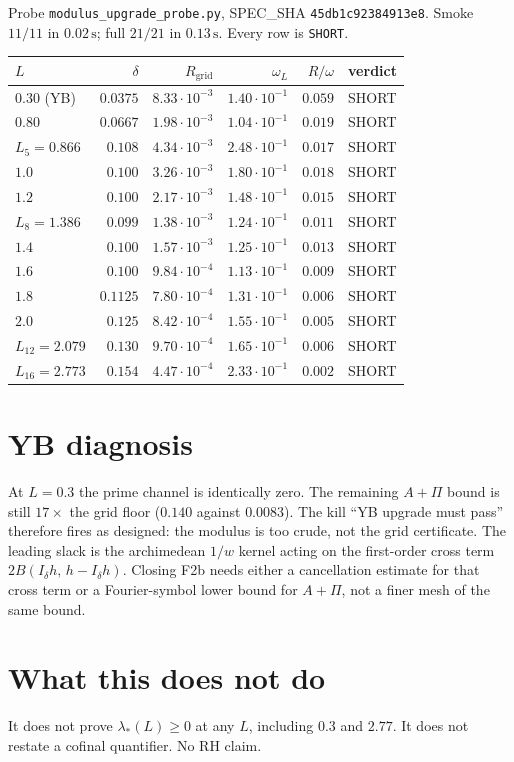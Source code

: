\documentclass[11pt]{article}
\theoremstyle{remark}
\begin{document}
Probe \texttt{modulus\_upgrade\_probe.py},
SPEC\_SHA \texttt{45db1c92384913e8}.
Smoke $11/11$ in $0.02\,\mathrm{s}$; full $21/21$ in $0.13\,\mathrm{s}$.
Every row is \texttt{SHORT}.

\begin{center}
\small
\begin{tabular}{@{}lrrrrl@{}}
\toprule
$L$ & $\delta$ & $R_{\mathrm{grid}}$ & $\omega_L$ & $R/\omega$ & verdict\\
\midrule
$0.30$ (YB) & $0.0375$ & $8.33\cdot10^{-3}$ & $1.40\cdot10^{-1}$ & $0.059$ & SHORT\\
$0.80$ & $0.0667$ & $1.98\cdot10^{-3}$ & $1.04\cdot10^{-1}$ & $0.019$ & SHORT\\
$L_5=0.866$ & $0.108$ & $4.34\cdot10^{-3}$ & $2.48\cdot10^{-1}$ & $0.017$ & SHORT\\
$1.0$ & $0.100$ & $3.26\cdot10^{-3}$ & $1.80\cdot10^{-1}$ & $0.018$ & SHORT\\
$1.2$ & $0.100$ & $2.17\cdot10^{-3}$ & $1.48\cdot10^{-1}$ & $0.015$ & SHORT\\
$L_8=1.386$ & $0.099$ & $1.38\cdot10^{-3}$ & $1.24\cdot10^{-1}$ & $0.011$ & SHORT\\
$1.4$ & $0.100$ & $1.57\cdot10^{-3}$ & $1.25\cdot10^{-1}$ & $0.013$ & SHORT\\
$1.6$ & $0.100$ & $9.84\cdot10^{-4}$ & $1.13\cdot10^{-1}$ & $0.009$ & SHORT\\
$1.8$ & $0.1125$ & $7.80\cdot10^{-4}$ & $1.31\cdot10^{-1}$ & $0.006$ & SHORT\\
$2.0$ & $0.125$ & $8.42\cdot10^{-4}$ & $1.55\cdot10^{-1}$ & $0.005$ & SHORT\\
$L_{12}=2.079$ & $0.130$ & $9.70\cdot10^{-4}$ & $1.65\cdot10^{-1}$ & $0.006$ & SHORT\\
$L_{16}=2.773$ & $0.154$ & $4.47\cdot10^{-4}$ & $2.33\cdot10^{-1}$ & $0.002$ & SHORT\\
\bottomrule
\end{tabular}
\end{center}

\section{YB diagnosis}

At $L=0.3$ the prime channel is identically zero.  The remaining
$A+\Pi$ bound is still $17\times$ the grid floor
($0.140$ against $0.0083$).  The kill ``YB upgrade must pass''
therefore fires as designed: the modulus is too crude, not the
grid certificate.  The leading slack is the archimedean $1/w$
kernel acting on the first-order cross term
$2B(I_\delta h,\,h-I_\delta h)$.  Closing F2b needs either a
cancellation estimate for that cross term or a Fourier-symbol
lower bound for $A+\Pi$, not a finer mesh of the same bound.

\section{What this does not do}

It does not prove $\lambda_*(L)\ge0$ at any $L$, including $0.3$
and $2.77$.  It does not restate a cofinal quantifier.  No RH claim.
\end{document}
